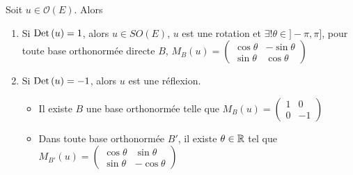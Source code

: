 \begin{proposition}{}{}
    Soit $u \in \mathcal O(E)$. Alors 
    \begin{enumerate}
        \item Si $\operatorname{Det} \,(u) = 1$, alors $u \in SO(E)$, $u$ est une rotation 
        et $\exists ! \theta \in ]- \pi, \pi]$, pour toute base orthonormée directe 
        $B$, $M_B(u) = \begin{pmatrix}
            \cos \theta & -\sin \theta \\
            \sin \theta & \cos \theta
        \end{pmatrix}$
        \item Si $\operatorname{Det} \,(u) = -1$, alors $u$ est une réflexion. 
        \begin{itemize}
            \item Il existe $B$ une base orthonormée telle que $M_B(u) = \begin{pmatrix}
                1 & 0 \\
                0 & -1
            \end{pmatrix}$
            \item Dans toute base orthonormée $B'$, il existe $\theta \in \mathbb{R}$ tel que $M_{B'}(u) = \begin{pmatrix}
                \cos \theta & \sin \theta \\
                \sin \theta & -\cos \theta
            \end{pmatrix}$
        \end{itemize}
    \end{enumerate}
\end{proposition}


